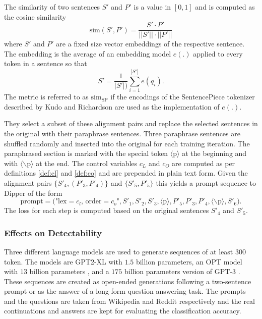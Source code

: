     \begin{definition}
    \label{def:simsp}
        The similarity of two sentences $S'$ and $P'$ is a value in $[0,1]$ and is computed as the cosine similarity
        \begin{equation}
            \text{sim}(S',P') = \frac{S' \cdot P'}{||S'|| \cdot ||P'||}
        \end{equation}
        where $S'$ and $P'$ are a fixed size vector embeddings of the respective sentence.
        The embedding is the average of an embedding model $e(.)$ applied to every token in a sentence so that
        \begin{equation}
        \label{eq:embedd}
            S' = \frac{1}{|S'|)} \sum_{i=1}^{|S'|} e(q_i) \text{.}
        \end{equation}
        The metric is referred to as $\mathrm{sim}_{\mathrm{SP}}$ if the encodings of the SentencePiece tokenizer described by Kudo and Richardson \cite{kudo2018sentencepiece} are used as the implementation of $e(.)$.
    \end{definition}
        
    They select a subset of these alignment pairs and replace the selected sentences in the original with their paraphrase sentences.
    Three paraphrase sentences are shuffled randomly and inserted into the original for each training iteration.
    The paraphrased section is marked with the special token $\langle \mathrm{p} \rangle$ at the beginning and with $\langle \backslash \mathrm{p} \rangle$ at the end.
    The control variables $c_L$ and $c_O$ are computed as per definitions \ref{def:cl} and \ref{def:co} and are prepended in plain text form.
    Given the alignment pairs $\{S'_4, (P'_3,P'_4)\}$ and $\{S'_5, P'_5\}$ this yields a prompt sequence to Dipper of the form
    \begin{equation}
        \text{prompt}=\big( \text{"lex}=c_l \text{, order}=c_o \text{"},S'_1,S'_2,S'_3,\langle \mathrm{p} \rangle,P'_5,P'_3,P'_4,\langle \backslash \mathrm{p} \rangle,S'_6 \big) \text{.}
    \end{equation}
    The loss for each step is computed based on the original sentences $S'_4$ and $S'_5$. 

    \subsubsection{Effects on Detectability}
    Three different language models are used to generate sequences of at least $300$ token.
    The models are GPT2-XL \cite{radford2019language} with $1.5$ billion parameters, an OPT model with $13$ billion parameters \cite{zhang2022opt}, and a $175$ billion parameters version of GPT-3 \cite{brown2020language}. 
    These sequences are created as open-ended generations following a two-sentence prompt or as the answer of a long-form question answering task.
    The prompts and the questions are taken from Wikipedia and Reddit respectively and the real continuations and answers are kept for evaluating the classification accuracy.

